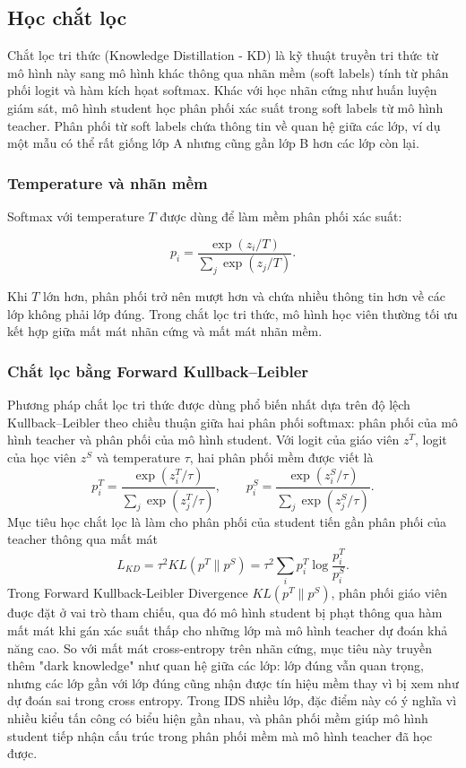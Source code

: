 \subsection{Học chắt lọc}

Chắt lọc tri thức (Knowledge Distillation - KD) \cite{hinton2015kd} là kỹ thuật truyền tri thức từ mô hình này sang mô hình khác thông qua nhãn mềm (soft labels) tính từ phân phối logit và hàm kích họat softmax. Khác với học nhãn cứng như huấn luyện giám sát, mô hình student học phân phối xác suất trong soft labels từ mô hình teacher. Phân phối từ soft labels chứa thông tin về quan hệ giữa các lớp, ví dụ một mẫu có thể rất giống lớp A nhưng cũng gần lớp B hơn các lớp còn lại.

\subsubsection{Temperature và nhãn mềm}

Softmax với temperature $T$ được dùng để làm mềm phân phối xác suất:

$$
p_i = \frac{\exp(z_i / T)}{\sum_j \exp(z_j / T)}.
$$

Khi $T$ lớn hơn, phân phối trở nên mượt hơn và chứa nhiều thông tin hơn về các lớp không phải lớp đúng. Trong chắt lọc tri thức, mô hình học viên thường tối ưu kết hợp giữa mất mát nhãn cứng và mất mát nhãn mềm.

\subsubsection{Chắt lọc bằng Forward Kullback--Leibler}

Phương pháp chắt lọc tri thức được dùng phổ biến nhất dựa trên độ lệch Kullback--Leibler theo chiều thuận giữa hai phân phối softmax: phân phối của mô hình teacher và phân phối của mô hình student. Với logit của giáo viên $z^T$, logit của học viên $z^S$ và temperature $\tau$, hai phân phối mềm được viết là
$$
p_i^T=\frac{\exp(z_i^T/\tau)}{\sum_j\exp(z_j^T/\tau)},
\qquad
p_i^S=\frac{\exp(z_i^S/\tau)}{\sum_j\exp(z_j^S/\tau)}.
$$
Mục tiêu học chắt lọc là làm cho phân phối của student tiến gần phân phối của teacher thông qua mất mát
$$
L_{KD}=\tau^2 KL(p^T\|p^S)=\tau^2\sum_i p_i^T\log\frac{p_i^T}{p_i^S}.
$$
Trong Forward Kullback-Leibler Divergence $KL(p^T\|p^S)$, phân phối giáo viên đuợc đặt ở vai trò tham chiếu, qua đó mô hình student bị phạt thông qua hàm mất mát khi gán xác suất thấp cho những lớp mà mô hình teacher dự đoán khả năng cao. So với mất mát cross-entropy trên nhãn cứng, mục tiêu này truyền thêm "dark knowledge" như quan hệ giữa các lớp: lớp đúng vẫn quan trọng, nhưng các lớp gần với lớp đúng cũng nhận được tín hiệu mềm thay vì bị xem như dự đoán sai trong cross entropy. Trong IDS nhiều lớp, đặc điểm này có ý nghĩa vì nhiều kiểu tấn công có biểu hiện gần nhau, và phân phối mềm giúp mô hình student tiếp nhận cấu trúc trong phân phối mềm mà mô hình teacher đã học được.

